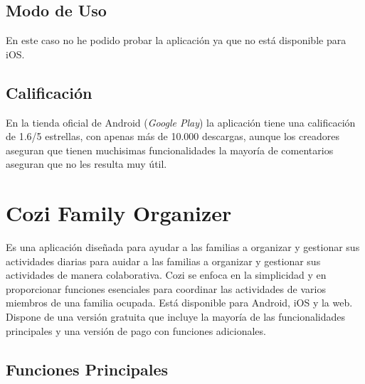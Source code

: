 \documentclass{article}
\begin{document}
\subsection{Modo de Uso}
En este caso no he podido probar la aplicación ya que no está disponible para iOS.

\subsection{Calificación}
En la tienda oficial de Android (\textit{Google Play}) la aplicación tiene una calificación de 1.6/5 estrellas,
con apenas más de 10.000 descargas, aunque los creadores aseguran que tienen muchisimas funcionalidades la mayoría de comentarios
aseguran que no les resulta muy útil.

\section{Cozi Family Organizer}
Es una aplicación diseñada para ayudar a las familias a organizar y gestionar sus actividades diarias para auidar a las familias a organizar y 
gestionar sus actividades de manera colaborativa. Cozi se enfoca en la simplicidad y en proporcionar funciones esenciales para coordinar 
las actividades de varios miembros de una familia ocupada. Está disponible para Android, iOS y la web. Dispone de una versión 
gratuita que incluye la mayoría de las funcionalidades principales y una versión de pago con funciones adicionales.

\subsection{Funciones Principales}
\end{document}
